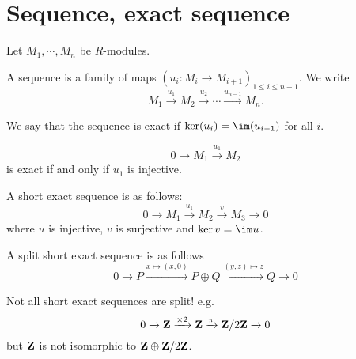 \section{Sequence, exact sequence}

Let $M_1, \cdots, M_n$ be $R$-modules.

\begin{dfn}
    A sequence is a family of maps $(u_i : M_i \longrightarrow  M_{i+1})_{1\leq i\leq n-1}$. We write \[M_1\xrightarrow{u_1} M_2 \xrightarrow{u_2}\cdots \xrightarrow{u_{n-1}}M_n.\]

    We say that the sequence is exact if $\ker (u_{i})=\im(u_{i-1})$ for all $i$.
\end{dfn}

\begin{ex}
\[
    0 \xrightarrow{} M_1 \xrightarrow{u_1} M_2
\] 
is exact if and only if $u_1$ is injective.
\end{ex}

\begin{dfn}
    A short exact sequence is as follows: \[0 \xrightarrow{} M_1 \xrightarrow{u_1} M_2\xrightarrow{v}M_3 \xrightarrow{}0\] where $u$ is injective, $v$ is surjective and $\ker v=\im u$.
\end{dfn}

\begin{dfn}
    A split short exact sequence is as follows \[0 \xrightarrow{} P \xrightarrow{x\mapsto (x,0)} P\oplus Q \xrightarrow{(y,z)\mapsto z}Q \xrightarrow{}0\]
\end{dfn}

\begin{rem}
    Not all short exact sequences are split! e.g. \[0 \xrightarrow{} \mathbf Z \xrightarrow{\times 2}\mathbf Z \xrightarrow{\pi} \mathbf Z /2 \mathbf Z \xrightarrow{} 0\] but $\mathbf Z$ is not isomorphic to $\mathbf Z \oplus \mathbf Z / 2\mathbf Z$.
\end{rem}
